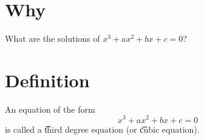 
\section*{Why}

What are the solutions of $x^3 + ax^2 + b x + c = 0$?

\section*{Definition}

An equation of the form
\[
x^3 + ax^2 + b x + c = 0
\]
is called a \t{third degree equation} (or \t{cubic equation}).

\blankpage